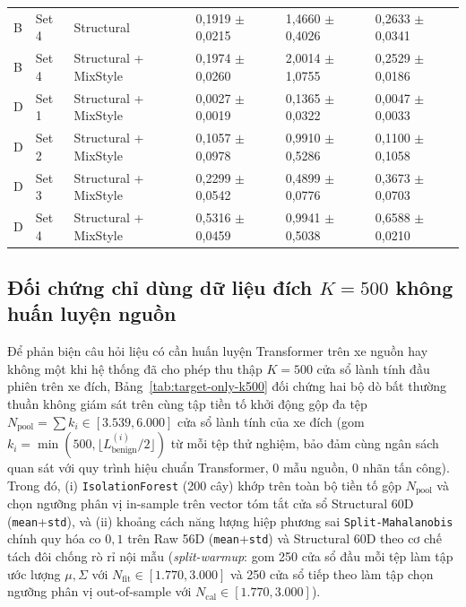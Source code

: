 \documentclass[12pt, a4paper, reqno, oneside]{book}
\DeclareRobustCommand{\code}[1]{\nolinkurl{#1}}
\begin{document}
{\begin{longtable}{P{1.1cm}P{1.2cm}P{3.6cm}P{2.3cm}P{2.2cm}P{2.2cm}}
B & Set 4 & Structural & 0,1919 $\pm$ 0,0215 & 1,4660 $\pm$ 0,4026 & 0,2633 $\pm$ 0,0341\\
B & Set 4 & Structural + MixStyle & 0,1974 $\pm$ 0,0260 & 2,0014 $\pm$ 1,0755 & 0,2529 $\pm$ 0,0186\\
\midrule
D & Set 1 & Structural + MixStyle & 0,0027 $\pm$ 0,0019 & 0,1365 $\pm$ 0,0322 & 0,0047 $\pm$ 0,0033\\
D & Set 2 & Structural + MixStyle & 0,1057 $\pm$ 0,0978 & 0,9910 $\pm$ 0,5286 & 0,1100 $\pm$ 0,1058\\
D & Set 3 & Structural + MixStyle & 0,2299 $\pm$ 0,0542 & 0,4899 $\pm$ 0,0776 & 0,3673 $\pm$ 0,0703\\
D & Set 4 & Structural + MixStyle & 0,5316 $\pm$ 0,0459 & 0,9941 $\pm$ 0,5038 & 0,6588 $\pm$ 0,0210\\
\bottomrule\end{longtable}

\subsection{Đối chứng chỉ dùng dữ liệu đích \texorpdfstring{$K=500$}{K=500} không huấn luyện nguồn}\label{subsec:target-only-k500}
Để phản biện câu hỏi liệu có cần huấn luyện Transformer trên xe nguồn hay không một khi hệ thống đã cho phép thu thập $K=500$ cửa sổ lành tính đầu phiên trên xe đích, Bảng~\ref{tab:target-only-k500} đối chứng hai bộ dò bất thường thuần không giám sát trên cùng tập tiền tố khởi động gộp đa tệp $N_{\text{pool}} = \sum k_i \in [3.539, 6.000]$ cửa sổ lành tính của xe đích (gom $k_i = \min(500, \lfloor L_{\text{benign}}^{(i)}/2\rfloor)$ từ mỗi tệp thử nghiệm, bảo đảm cùng ngân sách quan sát với quy trình hiệu chuẩn Transformer, 0 mẫu nguồn, 0 nhãn tấn công). Trong đó, (i) \code{IsolationForest} (200 cây) khớp trên toàn bộ tiền tố gộp $N_{\text{pool}}$ và chọn ngưỡng phân vị in-sample trên vector tóm tắt cửa sổ Structural 60D (\code{mean}+\code{std}), và (ii) khoảng cách năng lượng hiệp phương sai \code{Split-Mahalanobis} chính quy hóa co $0{,}1$ trên Raw 56D (\code{mean}+\code{std}) và Structural 60D theo cơ chế tách đôi chống rò rỉ nội mẫu (\textit{split-warmup}: gom 250 cửa sổ đầu mỗi tệp làm tập ước lượng $\mu,\Sigma$ với $N_{\text{fit}} \in [1.770, 3.000]$ và 250 cửa sổ tiếp theo làm tập chọn ngưỡng phân vị out-of-sample với $N_{\text{cal}} \in [1.770, 3.000]$).

}
\end{document}
